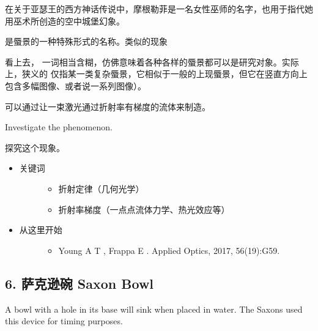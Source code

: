 \documentclass[a4paper,10pt,english]{sphinxmanual}
\begin{document}
\begin{footnote}[4]\sphinxAtStartFootnote
在关于亚瑟王的西方神话传说中，摩根勒菲是一名女性巫师的名字，也用于指代她用巫术所创造的空中城堡幻象。
%
\end{footnote} 是蜃景的一种特殊形式的名称。类似的现象 %
\begin{footnote}[5]\sphinxAtStartFootnote
看上去，  一词相当含糊，仿佛意味着各种各样的蜃景都可以是研究对象。实际上，狭义的  仅指某一类复杂蜃景，它相似于一般的上现蜃景，但它在竖直方向上包含多幅图像、或者说一系列图像）。
%
\end{footnote} 可以通过让一束激光通过折射率有梯度的流体来制造。

Investigate the phenomenon.

探究这个现象。

\noindent{}
\begin{itemize}
\item {} \begin{description}
\item[{关键词}] \leavevmode\begin{itemize}
\item {} 
折射定律（几何光学）

\item {} 
折射率梯度（一点点流体力学、热光效应等）

\end{itemize}

\end{description}

\item {} \begin{description}
\item[{从这里开始}] \leavevmode\begin{itemize}
\item {} 
Young A T , Frappa E .  Applied Optics, 2017, 56(19):G59.

\end{itemize}

\end{description}

\end{itemize}


\subsection{6. 萨克逊碗 Saxon Bowl}
\label{\detokenize{8. Appendix:saxon-bowl}}
A bowl with a hole in its base will sink when placed in water. The Saxons used this device for timing purposes.
\end{document}
